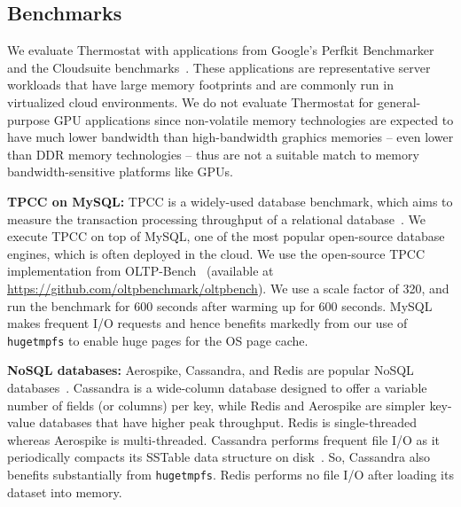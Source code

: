 


\subsection{Benchmarks}
\label{benchmarks}
We evaluate Thermostat with applications from Google's Perfkit Benchmarker and
the Cloudsuite benchmarks~\cite{perfkitbenchmarker, cloudsuite}. These
applications are representative server workloads that have large memory
footprints and are commonly run in virtualized cloud environments.  We do not
evaluate Thermostat for general-purpose GPU applications since non-volatile memory
technologies are expected to have much lower bandwidth than high-bandwidth
graphics memories -- even lower than DDR memory technologies -- thus are not a
suitable match to memory bandwidth-sensitive platforms like GPUs.

{\bf TPCC on MySQL:} TPCC is a widely-used database benchmark, which aims to measure
the transaction processing throughput of a relational database~\cite{tpcc}. We 
execute TPCC on top of MySQL, one of the most popular open-source database 
engines, which is often deployed in the cloud.  We use the open-source
TPCC implementation from OLTP-Bench~\cite{oltpbench} (available at
\url{https://github.com/oltpbenchmark/oltpbench}). We use a scale factor of
320, and run the benchmark for 600 seconds after warming up for 600 seconds.
MySQL makes frequent I/O requests and hence benefits markedly from our use
of {\tt hugetmpfs} to enable huge pages for the OS page cache.

{\bf NoSQL databases:} Aerospike, Cassandra, and Redis are popular NoSQL
databases~\cite{aerospike, cassandra, redis}.
Cassandra is a wide-column database designed to offer a variable number of fields
(or columns) per key, while Redis and Aerospike are simpler key-value databases 
that have higher peak throughput. Redis is single-threaded whereas Aerospike is
multi-threaded.
Cassandra performs frequent file I/O as it periodically compacts its SSTable
data structure on disk~\cite{ref:sstable}. So, Cassandra also benefits substantially
from {\tt hugetmpfs}. Redis performs no file I/O after loading its dataset into memory.


